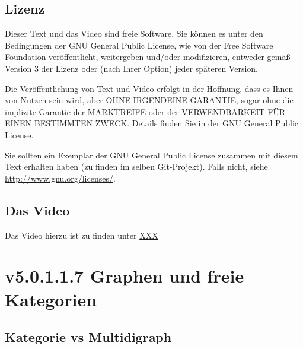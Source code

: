 \documentclass[a4paper]{amsart}
\theoremstyle{definition}
\begin{document}
\subsection*{Lizenz}
Dieser Text und das Video sind freie Software. Sie können es unter den Bedingungen der
GNU General Public License, wie von der Free Software Foundation veröffentlicht, weitergeben
und/oder modifizieren, entweder gemäß Version 3 der Lizenz oder (nach Ihrer Option) jeder späteren Version.

Die Veröffentlichung von Text und Video erfolgt in der Hoffnung, dass es Ihnen von Nutzen sein wird,
aber OHNE IRGENDEINE GARANTIE, sogar ohne die implizite Garantie der MARKTREIFE oder der
VERWENDBARKEIT FÜR EINEN BESTIMMTEN ZWECK. Details finden Sie in der GNU General Public License.

Sie sollten ein Exemplar der GNU General Public License zusammen mit diesem Text erhalten haben
(zu finden im selben Git-Projekt).
Falls nicht, siehe \url{http://www.gnu.org/licenses/}.

\subsection*{Das Video}
Das Video hierzu ist zu finden unter
{\tiny
   \url{XXX}
}

\section{v5.0.1.1.7 Graphen und freie Kategorien}

\subsection{Kategorie vs Multidigraph}
\end{document}
